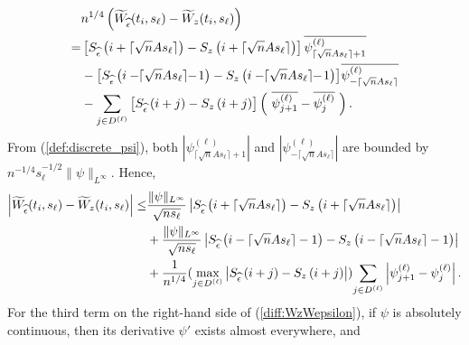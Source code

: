 \documentclass{amsart}
\begin{document}
\begin{align}\notag
&n^{1/4}\left(\widetilde{W}_{\widehat{\epsilon}}(t_{i},s_{\ell}) -\widetilde{W}_{z}(t_{i},s_{\ell})\right)
\\\notag=&
\left[S_{\widehat{\epsilon}}\left(i+\lceil \sqrt{n}As_{\ell}\rceil\right)- S_{z}\left(i+\lceil \sqrt{n}As_{\ell}\rceil\right)\right]\overline{\psi_{\lceil \sqrt{n}As_{\ell}\rceil+1}^{(\ell)}}
\\\notag&-
\left[S_{\widehat{\epsilon}}\left(i-\hspace{-0.1cm}\lceil \sqrt{n}As_{\ell}\rceil\hspace{-0.1cm}-\hspace{-0.05cm}1\right)-S_{z}\left(i-\hspace{-0.1cm}\lceil \sqrt{n}As_{\ell}\rceil\hspace{-0.1cm}-\hspace{-0.05cm}1\right)\right]\hspace{-0.05cm}
\overline{\psi_{-\lceil \sqrt{n}As_{\ell}\rceil}^{(\ell)}}
\\\notag&-\underset{j\in D^{(\ell)}}{\sum}\left[ S_{\widehat{\epsilon}}\left(i+j\right) -S_{z}\left(i+j\right)\right]\left(\ \overline{\psi^{(\ell)}_{j+1}}-\overline{\psi^{(\ell)}_{j}}\ \right).
\end{align}
From (\ref{def:discrete_psi}), both $|\psi_{\lceil \sqrt{n}As_{\ell}\rceil+1}^{(\ell)}|$ and $|\psi_{-\lceil \sqrt{n}As_{\ell}\rceil}^{(\ell)}|$
are bounded by $n^{-1/4}s_{\ell}^{-1/2}\|\psi\|_{L^{\infty}}$. Hence,
\begin{align}\notag
\left|\widetilde{W}_{\widehat{\epsilon}}(t_{i},s_{\ell}) -\widetilde{W}_{z}(t_{i},s_{\ell})\right|
\leq&
\frac{\|\psi\|_{L^{\infty}}}{\sqrt{n s_{\ell}}}\left|S_{\widehat{\epsilon}}\left(i+\lceil \sqrt{n}As_{\ell}\rceil \right)- S_{z}\left(i+\lceil \sqrt{n}As_{\ell}\rceil\right)\right|
\\\notag&+\frac{\|\psi\|_{L^{\infty}}}{\sqrt{ ns_{\ell}}}\left|S_{\widehat{\epsilon}}\left(i-\lceil \sqrt{n}As_{\ell}\rceil-1\right)-S_{z}\left(i-\lceil \sqrt{n}As_{\ell}\rceil-1\right)\right|
\\\label{diff:WzWepsilon}&+\frac{1}{n^{1/4}}
(\underset{j\in D^{(\ell)}}{\max}\left|S_{\widehat{\epsilon}}\left(i+j\right) -S_{z}\left(i+j\right)\right|)
\underset{j\in D^{(\ell)}}{\sum}\left|\psi^{(\ell)}_{j+1}-\psi^{(\ell)}_{j}\right|.
\end{align}
For the third term on the right-hand side of (\ref{diff:WzWepsilon}), if $\psi$ is absolutely continuous, then its derivative $\psi'$ exists almost everywhere, and
\end{document}
